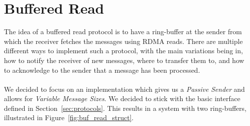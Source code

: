 
\section{Buffered Read}\label{sec:conn:buf_read}

The idea of a buffered read protocol is to have a ring-buffer at the sender from which the receiver fetches the messages using
RDMA reads. There are multiple different ways to implement such a protocol, with the main variations being in, how to notify
the receiver of new messages, where to transfer them to, and how to acknowledge to the sender that a message has been processed.

\paragraph{} We decided to focus on an implementation which gives us a \emph{Passive Sender} and allows for 
\emph{Variable Message Sizes}. We decided to stick with the basic interface defined in Section~\ref{sec:protocols}. This 
results in a system with two ring-buffers, illustrated in Figure~\ref{fig:buf_read_struct}.

